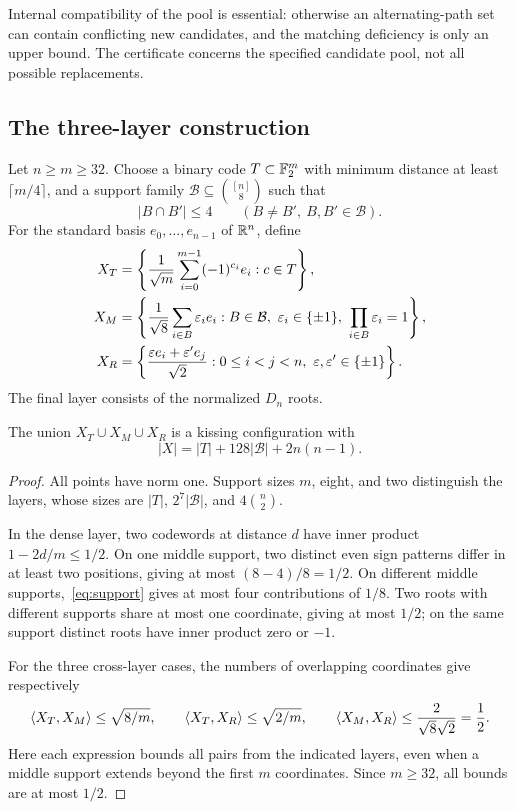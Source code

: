 Internal compatibility of the pool is essential: otherwise an
alternating-path set can contain conflicting new candidates, and the
matching deficiency is only an upper bound. The certificate concerns
the specified candidate pool, not all possible replacements.

\subsection{The three-layer construction}
Let $n\ge m\ge32$. Choose a binary code $T\subset\mathbb F_2^m$ with minimum
distance at least $\lceil m/4\rceil$, and a support family
$\mathcal B\subseteq\binom{[n]}8$ such that
\begin{equation}\label{eq:support}
 |B\cap B'|\le4\qquad(B\ne B',\ B,B'\in\mathcal B).
\end{equation}
For the standard basis $e_0,\ldots,e_{n-1}$ of $\mathbb R^n$, define
\begin{align}
 X_T&=\left\{\frac1{\sqrt m}\sum_{i=0}^{m-1}(-1)^{c_i}e_i:c\in T\right\},
 \label{eq:sign-layer}\\
 X_M&=\left\{\frac1{\sqrt8}\sum_{i\in B}\varepsilon_i e_i:
       B\in\mathcal B,\ \varepsilon_i\in\{\pm1\},\ \prod_{i\in B}\varepsilon_i=1\right\},
 \label{eq:middle-layer}\\
 X_R&=\left\{\frac{\varepsilon e_i+\varepsilon'e_j}{\sqrt2}:
       0\le i<j<n,\ \varepsilon,\varepsilon'\in\{\pm1\}\right\}.
 \label{eq:root-layer}
\end{align}
The final layer consists of the normalized $D_n$ roots.

\begin{proposition}
\label{prop:ers}
The union $X_T\cup X_M\cup X_R$ is a kissing configuration with
\begin{equation}\label{eq:ers-count}
 |X|=|T|+128|\mathcal B|+2n(n-1).
\end{equation}
\end{proposition}
\begin{proof}
All points have norm one. Support sizes $m$, eight, and two distinguish
the layers, whose sizes are $|T|$, $2^7|\mathcal B|$, and
$4\binom n2$.

In the dense layer, two codewords at distance $d$ have inner product
$1-2d/m\le1/2$. On one middle support, two distinct even sign patterns
differ in at least two positions, giving at most $(8-4)/8=1/2$.
On different middle supports,~\eqref{eq:support} gives at most four
contributions of $1/8$. Two roots with different supports share at most
one coordinate, giving at most $1/2$; on the same support distinct
roots have inner product zero or $-1$.

For the three cross-layer cases, the numbers of overlapping coordinates
give respectively
\begin{equation}\label{eq:ers-cross}
 \langle X_T,X_M\rangle\le\sqrt{8/m},\qquad
 \langle X_T,X_R\rangle\le\sqrt{2/m},\qquad
 \langle X_M,X_R\rangle\le\frac{2}{\sqrt8\sqrt2}=\frac12.
\end{equation}
Here each expression bounds all pairs from the indicated layers,
even when a middle support extends beyond the first $m$ coordinates.
Since $m\ge32$, all bounds are at most $1/2$.
\end{proof}

